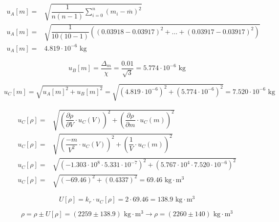 \documentclass[fleqn]{protokol}
\newcommand{\neweq}{\\[0.8ex]}
\begin{document}
        \begin{align*}
            u_A[m] = &\sqrt{ \dfrac{1}{n(n-1)} \sum_{i = 0}^{n} (m_i - \overline{m})^2 } \neweq
            u_A[m] = &\sqrt{ \dfrac{1}{10(10-1)} ((0.03918 - 0.03917)^2 + \dots + (0.03917 - 0.03917)^2) } \neweq
            u_A[m] = &4.819 \cdot 10^{-6} \text{ kg}
        \end{align*}

        \begin{equation*}
            u_B[m] = \dfrac{\Delta_m}{\chi} = \dfrac{0.01}{\sqrt{3}} = 5.774 \cdot 10^{-6} \text{ kg}
        \end{equation*}

        \begin{equation*}
            u_C[m] = \sqrt{ u_A[m]^2 + u_B[m]^2  } = \sqrt{ (4.819 \cdot 10^{-6})^2 + (5.774 \cdot 10^{-6})^2 } = 7.520 \cdot 10^{-6} \text{ kg}
        \end{equation*}

        \begin{align*}
            u_C[\rho] = &\sqrt{ \left( \dfrac{\partial \rho}{\partial V} \cdot u_C(V) \right)^2 + \left( \dfrac{\partial \rho}{\partial m} \cdot u_C(m) \right)^2} \neweq
            u_C[\rho] = &\sqrt{ \left( \dfrac{-m}{V^2} \cdot u_C(V) \right)^2 + \left( \dfrac{1}{V} \cdot u_C(m) \right)^2  } \neweq
            u_C[\rho] = &\sqrt{ \left( -1.303 \cdot 10^{8} \cdot 5.331\cdot 10^{-7} \right)^2 + \left( 5.767 \cdot 10^{4} \cdot 7.520 \cdot 10^{-6} \right)^2  } \neweq
            u_C[\rho] = &\sqrt{ \left( -69.46  \right)^2 + \left( 0.4337 \right)^2  } = 69.46 \text{ kg$\cdot$m$^3$}
        \end{align*}

        \begin{equation*}
            U[\rho] = k_r \cdot u_C[\rho] = 2 \cdot 69.46 = 138.9 \text{ kg$\cdot$m$^3$}
        \end{equation*}

        \begin{equation*}
            \rho = \rho \pm U[\rho] = (2259 \pm 138.9) \text{ kg$\cdot$m$^3$} \rightarrow \boxed{ \rho = (2260 \pm 140) \text{ kg$\cdot$m$^3$}}
        \end{equation*}
\end{document}
